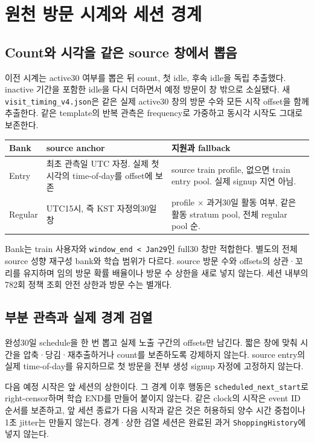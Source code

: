 \documentclass[11pt,a4paper]{article}
\newcommand{\code}[1]{{\ttfamily\footnotesize\nolinkurl{#1}}}
\newcommand{\page}{\clearpage}
\newcommand{\thead}{\rowcolor{pale}}
\begin{document}
\page
\section{원천 방문 시계와 세션 경계}
\subsection{Count와 시각을 같은 source 창에서 뽑음}
이전 시계는 active30 여부를 뽑은 뒤 count, 첫 idle, 후속 idle을 독립 추출했다. inactive 기간을 포함한 idle을 다시 더하면서 예정 방문이 창 밖으로 소실됐다. 새 \code{visit_timing_v4.json}은 같은 실제 active30 창의 방문 수와 모든 시작 offset을 함께 추출한다. 같은 template의 반복 관측은 frequency로 가중하고 동시각 시작도 그대로 보존한다.

\begin{tabularx}{\linewidth}{@{}P{.23\linewidth}P{.30\linewidth}Y@{}}\thead Bank & source anchor & 지원과 fallback\\\midrule
Entry & 최초 관측일 UTC 자정. 실제 첫 시각의 time-of-day를 offset에 보존 & source train profile, 없으면 train entry pool. 실제 signup 지연 아님.\\
Regular & UTC15시, 즉 KST 자정의30일 창 & profile $\times$ 과거30일 활동 여부, 같은 활동 stratum pool, 전체 regular pool 순.\\\bottomrule\end{tabularx}

Bank는 train 사용자와 \code{window_end < Jan29}인 full30 창만 적합한다. 별도의 전체 source 성향 재구성 bank와 학습 범위가 다르다. source 방문 수와 offsets의 상관·꼬리를 유지하며 임의 방문 확률 배율이나 방문 수 상한을 새로 넣지 않는다. 세션 내부의782회 정책 조회 안전 상한과 방문 수는 별개다.

\subsection{부분 관측과 실제 경계 검열}
완성30일 schedule을 한 번 뽑고 실제 노출 구간의 offsets만 남긴다. 짧은 창에 맞춰 시간을 압축·당김·재추출하거나 count를 보존하도록 강제하지 않는다. source entry의 실제 time-of-day를 유지하므로 첫 방문을 전부 생성 signup 자정에 고정하지 않는다.

다음 예정 시작은 앞 세션의 상한이다. 그 경계 이후 행동은 \code{scheduled_next_start}로 right-censor하며 학습 END를 만들어 붙이지 않는다. 같은 clock의 시작은 event ID 순서를 보존하고, 앞 세션 종료가 다음 시작과 같은 것은 허용하되 양수 시간 중첩이나 1초 jitter는 만들지 않는다. 경계·상한 검열 세션은 완료된 과거 \code{ShoppingHistory}에 넣지 않는다.
\end{document}
